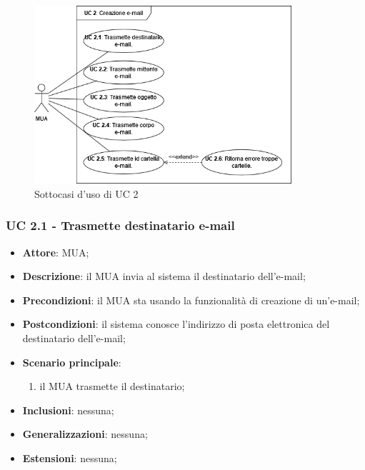     \begin{figure}[h]
        \includegraphics[width=0.85\textwidth]{sections/uc_imgs/UC02.png}
        \centering
        \caption{Sottocasi d'uso di UC 2}
    \end{figure}

    \subsubsection{UC 2.1 - Trasmette destinatario e-mail} \label{sec:UC2.1}
    \begin{itemize}
        \item \textbf{Attore}: MUA;
        \item \textbf{Descrizione}: il MUA invia al sistema il destinatario dell'e-mail;
        \item \textbf{Precondizioni}: il MUA sta usando la funzionalità di creazione di un'e-mail;
        \item \textbf{Postcondizioni}: il sistema conosce l'indirizzo di posta elettronica del destinatario dell'e-mail;
        \item \textbf{Scenario principale}:
            \begin{enumerate}
                \item il MUA trasmette il destinatario;
            \end{enumerate}
        \item \textbf{Inclusioni}: nessuna;
        \item \textbf{Generalizzazioni}: nessuna;
        \item \textbf{Estensioni}: nessuna;
    \end{itemize}

